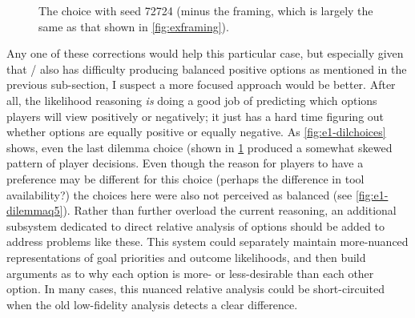 \begin{figure}[!t]
\centering
{}
\caption[``Dilemma'' choice 72724]{The \dlm{} choice with seed 72724 (minus the framing, which is largely the same as that shown in \cref{fig:exframing}).}
  \label{fig:e1-seed-72724}
\end{figure}


Any one of these corrections would help this particular case, but especially given that \dunyazad/ also has difficulty producing balanced positive options as mentioned in the previous sub-section, I suspect a more focused approach would be better.
%
After all, the likelihood reasoning \emph{is} doing a good job of predicting which options players will view positively or negatively; it just has a hard time figuring out whether options are equally positive or equally negative.
%
As \cref{fig:e1-dilchoices} shows, even the last dilemma choice (shown in \cref{fig:e1-seed-72724} produced a somewhat skewed pattern of player decisions.
%
Even though the reason for players to have a preference may be different for this choice (perhaps the difference in tool availability?) the choices here were also not perceived as balanced (see \cref{fig:e1-dilemmaq5}).
%
Rather than further overload the current reasoning, an additional subsystem dedicated to direct relative analysis of options should be added to address problems like these.
%
This system could separately maintain more-nuanced representations of goal priorities and outcome likelihoods, and then build arguments as to why each option is more- or less-desirable than each other option.
%
In many cases, this nuanced relative analysis could be short-circuited when the old low-fidelity analysis detects a clear difference.


